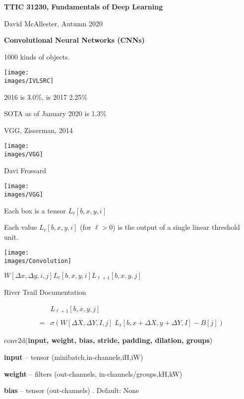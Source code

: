 




{\Huge

  \centerline{\bf TTIC 31230, Fundamentals of Deep Learning}
  \bigskip
  \centerline{David McAllester, Autumn 2020}

    \vfill
  \centerline{\bf Convolutional Neural Networks (CNNs)}
  \vfill
  \vfill



1000 kinds of objects.

\vfill
\centerline{\texttt{[image: \\images/IVLSRC]}}
2016 is 3.0\%, is 2017 2.25\%

\medskip
SOTA as of January 2020 is 1.3\%

{VGG, Zisserman, 2014}

\centerline{\texttt{[image: \\images/VGG]}}
\centerline{\large Davi Frossard}


\centerline{\texttt{[image: \\images/VGG]}}

\vfill
Each box is a tensor $L_\ell[b,x,y,i]$

\vfill
Each value $L_\ell[b,x,y,i]$ (for $\ell > 0$) is the output of a single linear threshold unit.


\centerline{\texttt{[image: \\images/Convolution]}}
\centerline{$W[\Delta x,\Delta y,i,j]$\hspace{6ex}$L_{{\ell}}[b,x,y,i]$\hspace{6ex}$L_{{\ell+1}}[b,x,y,j]$}
\centerline{\large River Trail Documentation}

\begin{eqnarray*}
 & &  L_{{\ell+1}}[b,x,y,j] \\
 \\
  & = &   \sigma\left(W[\Delta X, \Delta Y, I,j]\; L_{{\ell}}[b,x + \Delta X, y + \Delta Y, I] - B[j]\right)
\end{eqnarray*}


conv2d({\bf input, weight, bias, stride, padding, dilation, groups})

\bigskip
{\bf input} – tensor (minibatch,in-channels,iH,iW)

\medskip
{\bf weight} – filters (out-channels, in-channels/groups,kH,kW)

\medskip
{\bf bias} – tensor (out-channels) . Default: None

}
